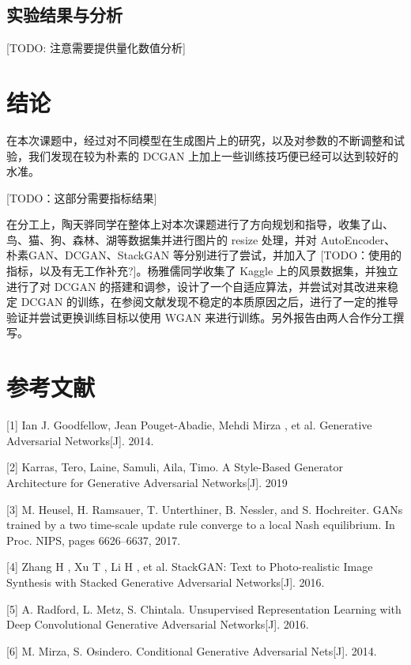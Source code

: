 \documentclass{article}
\begin{document}
\begin{CJK*}{UTF8}{gbsn}
  \subsection{实验结果与分析}

  [TODO: 注意需要提供量化数值分析]

\section{结论}

在本次课题中，经过对不同模型在生成图片上的研究，以及对参数的不断调整和试验，我们发现在较为朴素的 DCGAN 上加上一些训练技巧便已经可以达到较好的水准。

[TODO：这部分需要指标结果]

在分工上，陶天骅同学在整体上对本次课题进行了方向规划和指导，收集了山、鸟、猫、狗、森林、湖等数据集并进行图片的 resize 处理，并对 AutoEncoder、朴素GAN、DCGAN、StackGAN 等分别进行了尝试，并加入了 [TODO：使用的指标，以及有无工作补充?]。杨雅儒同学收集了 Kaggle 上的风景数据集，并独立进行了对 DCGAN 的搭建和调参，设计了一个自适应算法，并尝试对其改进来稳定 DCGAN 的训练，在参阅文献发现不稳定的本质原因之后，进行了一定的推导验证并尝试更换训练目标以使用 WGAN 来进行训练。另外报告由两人合作分工撰写。

\section*{参考文献}

\small

[1] Ian J. Goodfellow, Jean Pouget-Abadie, Mehdi Mirza , et al. Generative Adversarial Networks[J]. 2014.

[2] Karras, Tero, Laine, Samuli, Aila, Timo. A Style-Based Generator Architecture for Generative Adversarial Networks[J]. 2019

[3] M. Heusel, H. Ramsauer, T. Unterthiner, B. Nessler, and S. Hochreiter. GANs trained by a two time-scale update rule converge to a local Nash equilibrium. In Proc. NIPS, pages 6626–6637, 2017.

[4] Zhang H , Xu T , Li H , et al. StackGAN: Text to Photo-realistic Image Synthesis with Stacked Generative Adversarial Networks[J]. 2016.

[5] A. Radford, L. Metz, S. Chintala. Unsupervised Representation Learning with Deep Convolutional Generative Adversarial Networks[J]. 2016.

[6] M. Mirza, S. Osindero. Conditional Generative Adversarial Nets[J]. 2014.


\end{CJK*}
\end{document}
